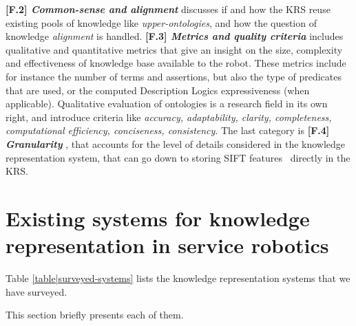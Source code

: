 \documentclass[journal]{IEEEtran}
\newcommand{\taxon}[2]{%
    \textbf{[#1] \emph{#2}}
}
\begin{document}
\taxon{F.2}{Common-sense and alignment} discusses if and how the KRS reuse
existing pools of knowledge like \emph{upper-ontologies}, and how the question
of knowledge \emph{alignment} is handled. \taxon{F.3}{Metrics and quality
criteria} includes qualitative and quantitative metrics that give an insight on
the size, complexity and effectiveness of knowledge base available to the robot.
These metrics include for instance the number of terms and assertions, but also
the type of predicates that are used, or the computed Description Logics
expressiveness (when applicable).  Qualitative evaluation of ontologies is a
research field in its own right, and introduce criteria like \emph{accuracy,
adaptability, clarity, completeness, computational efficiency, conciseness,
consistency}. The last category is \taxon{F.4}{Granularity}, that accounts for
the level of details considered in the knowledge representation system, that can
go down to storing SIFT features~\cite{Suh2007} directly in the KRS.

\section{Existing systems for knowledge representation in service robotics}
\label{sect|surveyed-systems}

Table \ref{table|surveyed-systems} lists the knowledge representation
systems that we have surveyed.

This section briefly presents each of them.
\end{document}
